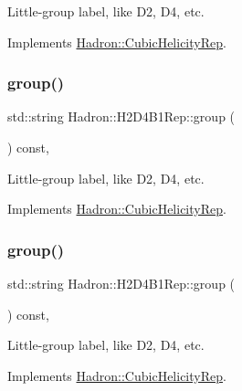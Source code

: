 Little-\/group label, like D2, D4, etc. 

Implements \mbox{\hyperlink{structHadron_1_1CubicHelicityRep_a101a7d76cd8ccdad0f272db44b766113}{Hadron\+::\+Cubic\+Helicity\+Rep}}.

\mbox{\label{structHadron_1_1H2D4B1Rep_aabf48ead894c892df15d0203bd7dc107}} 
\subsubsection{\texorpdfstring{group()}{group()}\hspace{0.1cm}{\footnotesize\ttfamily [3/5]}}
{\footnotesize\ttfamily std\+::string Hadron\+::\+H2\+D4\+B1\+Rep\+::group (\begin{DoxyParamCaption}{ }\end{DoxyParamCaption}) const\hspace{0.3cm}{\ttfamily [inline]}, {\ttfamily [virtual]}}

Little-\/group label, like D2, D4, etc. 

Implements \mbox{\hyperlink{structHadron_1_1CubicHelicityRep_a101a7d76cd8ccdad0f272db44b766113}{Hadron\+::\+Cubic\+Helicity\+Rep}}.

\mbox{\label{structHadron_1_1H2D4B1Rep_aabf48ead894c892df15d0203bd7dc107}} 
\subsubsection{\texorpdfstring{group()}{group()}\hspace{0.1cm}{\footnotesize\ttfamily [4/5]}}
{\footnotesize\ttfamily std\+::string Hadron\+::\+H2\+D4\+B1\+Rep\+::group (\begin{DoxyParamCaption}{ }\end{DoxyParamCaption}) const\hspace{0.3cm}{\ttfamily [inline]}, {\ttfamily [virtual]}}

Little-\/group label, like D2, D4, etc. 

Implements \mbox{\hyperlink{structHadron_1_1CubicHelicityRep_a101a7d76cd8ccdad0f272db44b766113}{Hadron\+::\+Cubic\+Helicity\+Rep}}.

\mbox{\label{structHadron_1_1H2D4B1Rep_aabf48ead894c892df15d0203bd7dc107}} 
